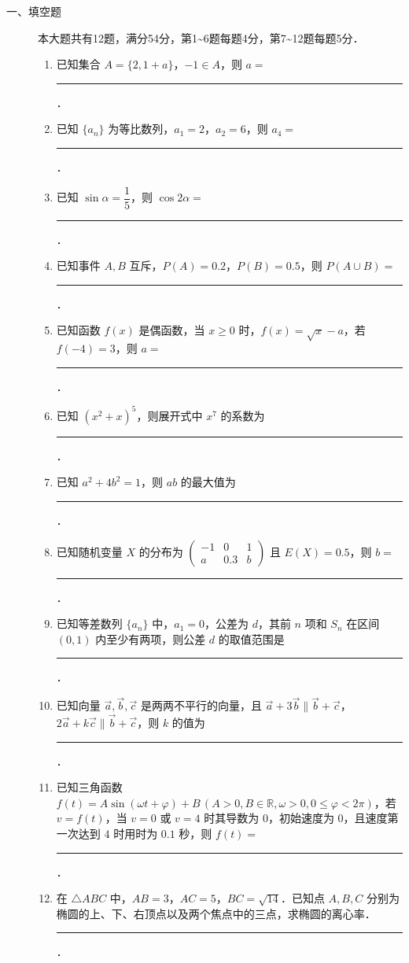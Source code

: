 \begin{description}
    \item[一、填空题] 本大题共有12题，满分54分，第1\textasciitilde6题每题4分，第7\textasciitilde12题每题5分．
    \begin{enumerate}[leftmargin=5pt]
        \item 已知集合 $A=\{2,1+a\}$，$-1\in A$，则 $a=$ \rule[-0.3ex]{3em}{0.4pt}．
        \item 已知 $\{a_n\}$ 为等比数列，$a_1=2$，$a_2=6$，则 $a_4=$ \rule[-0.3ex]{3em}{0.4pt}．
        \item 已知 $\sin\alpha=\dfrac{1}{5}$，则 $\cos2\alpha=$ \rule[-0.3ex]{3em}{0.4pt}．
        \item 已知事件 $A,B$ 互斥，$P(A)=0.2$，$P(B)=0.5$，则 $P(A\cup B)=$ \rule[-0.3ex]{3em}{0.4pt}．
        \item 已知函数 $f(x)$ 是偶函数，当 $x\geqslant0$ 时，$f(x)=\sqrt{x}-a$，若 $f(-4)=3$，则 $a=$ \rule[-0.3ex]{3em}{0.4pt}．
        \item 已知 $(x^2+x)^5$，则展开式中 $x^7$ 的系数为 \rule[-0.3ex]{3em}{0.4pt}．
        \item 已知 $a^2+4b^2=1$，则 $ab$ 的最大值为 \rule[-0.3ex]{3em}{0.4pt}．
        \item 已知随机变量 $X$ 的分布为 $\begin{pmatrix}-1 & 0 & 1 \\ a & 0.3 & b\end{pmatrix}$ 且 $E(X)=0.5$，则 $b=$ \rule[-0.3ex]{3em}{0.4pt}．
        \item 已知等差数列 $\{a_n\}$ 中，$a_1=0$，公差为 $d$，其前 $n$ 项和 $S_n$ 在区间 $(0,1)$ 内至少有两项，则公差 $d$ 的取值范围是 \rule[-0.3ex]{3em}{0.4pt}．
        \item 已知向量 $\vec{a},\vec{b},\vec{c}$ 是两两不平行的向量，且 $\vec{a}+3\vec{b}\parallel\vec{b}+\vec{c}$，$2\vec{a}+k\vec{c}\parallel\vec{b}+\vec{c}$，则 $k$ 的值为 \rule[-0.3ex]{3em}{0.4pt}．
        \item 已知三角函数 $f(t)=A\sin(\omega t+\varphi)+B\,(A>0,B\in\mathbb{R},\omega>0,0\leqslant\varphi<2\pi)$，若 $v=f(t)$，当 $v=0$ 或 $v=4$ 时其导数为 $0$，初始速度为 $0$，且速度第一次达到 $4$ 时用时为 $0.1$ 秒，则 $f(t)=$ \rule[-0.3ex]{3em}{0.4pt}．
        \item 在 $\triangle ABC$ 中，$AB=3$，$AC=5$，$BC=\sqrt{14}$．已知点 $A,B,C$ 分别为椭圆的上、下、右顶点以及两个焦点中的三点，求椭圆的离心率． \rule[-0.3ex]{3em}{0.4pt}．
    \end{enumerate}
\end{description}


